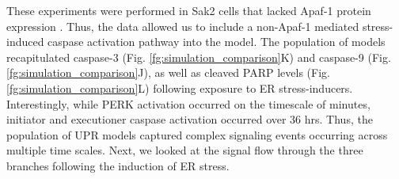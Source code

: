 \documentclass[fleqn,10pt]{wlscirep}
\begin{document}
These experiments were performed in Sak2 cells that lacked Apaf-1 protein expression \cite{rao2002cer}.
Thus, the data allowed us to include a non-Apaf-1 mediated stress-induced caspase activation pathway into the model.
The population of models recapitulated caspase-3 (Fig. \ref{fg:simulation_comparison}K) and caspase-9 (Fig. \ref{fg:simulation_comparison}J), as well as cleaved PARP levels (Fig. \ref{fg:simulation_comparison}L) following exposure to ER stress-inducers.
Interestingly, while PERK activation occurred on the timescale of minutes, initiator and executioner caspase activation occurred over 36 hrs.
Thus, the population of UPR models captured complex signaling events occurring across multiple time scales.
Next, we looked at the signal flow through the three branches following the induction of ER stress.

\end{document}
